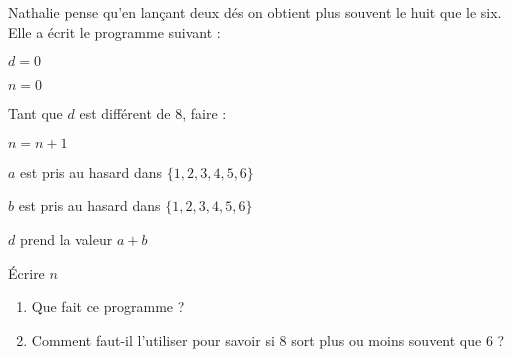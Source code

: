 
\begin{exercice}\label{exosmath-0584}

    Nathalie pense qu'en lançant deux dés on obtient plus souvent le huit que le six. Elle a écrit le programme suivant :

    \begin{fmpage}{0.9\linewidth}

    \( d=0\)

    \( n=0\)

    Tant que \( d\) est différent de \( 8\), faire :

    \hspace{0.5cm} \( n=n+1\)

    \hspace{0.5cm} \( a\) est pris au hasard dans \( \{ 1,2,3,4,5,6 \}\)

    \hspace{0.5cm} \( b\) est pris au hasard dans \( \{ 1,2,3,4,5,6 \}\)

    \hspace{0.5cm} \( d\) prend la valeur \( a+b\)

    Écrire \( n\)

\end{fmpage}

\begin{enumerate}
    \item
        Que fait ce programme ?
    \item
        Comment faut-il l'utiliser pour savoir si \( 8\) sort plus ou moins souvent que \( 6\) ?
\end{enumerate}

\end{exercice}
